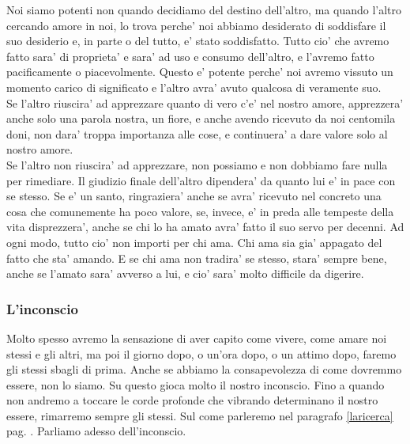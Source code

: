 Noi siamo potenti non quando decidiamo del destino dell'altro, ma quando l'altro cercando amore in noi, lo trova perche' noi abbiamo desiderato di soddisfare il suo desiderio e, in parte o del tutto, e' stato soddisfatto. Tutto cio' che avremo fatto sara' di proprieta' e sara' ad uso e consumo dell'altro, e l'avremo fatto pacificamente o piacevolmente. Questo e' potente perche' noi avremo vissuto un momento carico di significato e l'altro avra' avuto qualcosa di veramente suo.\\

Se l'altro riuscira' ad apprezzare quanto di vero c'e' nel nostro amore, apprezzera' anche solo una parola nostra, un fiore, e anche avendo ricevuto da noi centomila doni, non dara' troppa importanza alle cose, e continuera' a dare valore solo al nostro amore. \\
Se l'altro non riuscira' ad apprezzare, non possiamo e non dobbiamo fare nulla per rimediare. Il giudizio finale dell'altro dipendera' da quanto lui e' in pace con se stesso. Se e' un santo, ringraziera' anche se avra' ricevuto nel concreto una cosa che comunemente ha poco valore, se, invece, e' in preda alle tempeste della vita disprezzera', anche se chi lo ha amato avra' fatto il suo servo per decenni. Ad ogni modo, tutto cio' non importi per chi ama. Chi ama sia gia' appagato del fatto che sta' amando. E se chi ama non tradira' se stesso, stara' sempre bene, anche se l'amato sara' avverso a lui, e cio' sara' molto difficile da digerire. \\

\subsubsection{L'inconscio}

Molto spesso avremo la sensazione di aver capito come vivere, come amare noi stessi e gli altri, ma poi il giorno dopo, o un'ora dopo, o un attimo dopo, faremo gli stessi sbagli di prima. Anche se abbiamo la consapevolezza di come dovremmo essere, non lo siamo. Su questo gioca molto il nostro inconscio. Fino a quando non andremo a toccare le corde profonde che vibrando determinano il nostro essere, rimarremo sempre gli stessi. Sul come parleremo nel paragrafo \ref{laricerca} pag. \pageref{laricerca}. Parliamo adesso dell'inconscio.

